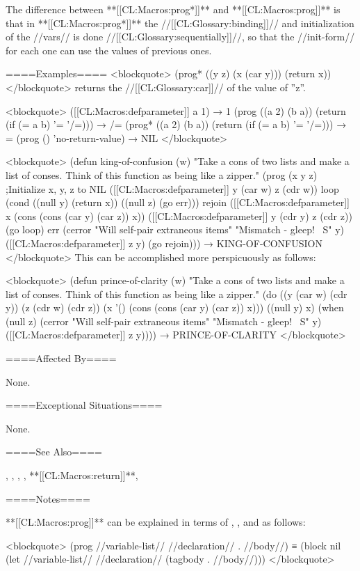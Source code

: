The difference between **[[CL:Macros:prog*]]** and **[[CL:Macros:prog]]** is that in **[[CL:Macros:prog*]]** the //[[CL:Glossary:binding]]// and initialization of the //vars// is done //[[CL:Glossary:sequentially]]//, so that the //init-form// for each one can use the values of previous ones.

====Examples==== <blockquote> (prog* ((y z) (x (car y))) (return x)) </blockquote> returns the //[[CL:Glossary:car]]// of the value of ''z''.

<blockquote> ([[CL:Macros:defparameter]] a 1) → 1 (prog ((a 2) (b a)) (return (if (= a b) '= '/=))) → /= (prog* ((a 2) (b a)) (return (if (= a b) '= '/=))) → = (prog () 'no-return-value) → NIL </blockquote>

<blockquote> (defun king-of-confusion (w) "Take a cons of two lists and make a list of conses. Think of this function as being like a zipper." (prog (x y z) ;Initialize x, y, z to NIL ([[CL:Macros:defparameter]] y (car w) z (cdr w)) loop (cond ((null y) (return x)) ((null z) (go err))) rejoin ([[CL:Macros:defparameter]] x (cons (cons (car y) (car z)) x)) ([[CL:Macros:defparameter]] y (cdr y) z (cdr z)) (go loop) err (cerror "Will self-pair extraneous items" "Mismatch - gleep! ~S" y) ([[CL:Macros:defparameter]] z y) (go rejoin))) → KING-OF-CONFUSION </blockquote> This can be accomplished more perspicuously as follows:

<blockquote> (defun prince-of-clarity (w) "Take a cons of two lists and make a list of conses. Think of this function as being like a zipper." (do ((y (car w) (cdr y)) (z (cdr w) (cdr z)) (x '() (cons (cons (car y) (car z)) x))) ((null y) x) (when (null z) (cerror "Will self-pair extraneous items" "Mismatch - gleep! ~S" y) ([[CL:Macros:defparameter]] z y)))) → PRINCE-OF-CLARITY </blockquote>

====Affected By====

None.

====Exceptional Situations====

None.

====See Also====

, , , , **[[CL:Macros:return]]**, {\secref\Evaluation}

====Notes====

**[[CL:Macros:prog]]** can be explained in terms of , , and  as follows:

<blockquote> (prog //variable-list// //declaration// . //body//) ≡ (block nil (let //variable-list// //declaration// (tagbody . //body//))) </blockquote>

